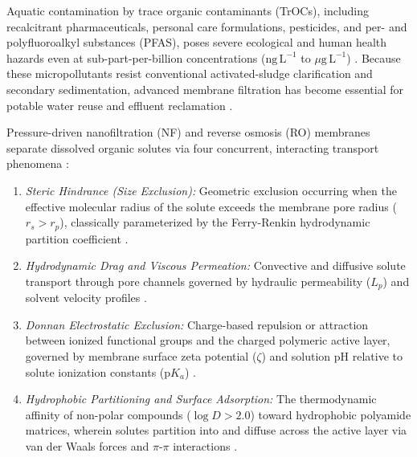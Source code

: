 \documentclass[11pt]{article}
\begin{document}
Aquatic contamination by trace organic contaminants (TrOCs), including recalcitrant pharmaceuticals, personal care formulations, pesticides, and per- and polyfluoroalkyl substances (PFAS), poses severe ecological and human health hazards even at sub-part-per-billion concentrations ($\mathrm{ng\,L^{-1}}$ to $\mu\mathrm{g\,L^{-1}}$) \cite{schwarzenbach2006,shannon2008,bellona2004}. Because these micropollutants resist conventional activated-sludge clarification and secondary sedimentation, advanced membrane filtration has become essential for potable water reuse and effluent reclamation \cite{verliefde2007,elimelech2011,werber2016,mohammad2015}.

Pressure-driven nanofiltration (NF) and reverse osmosis (RO) membranes separate dissolved organic solutes via four concurrent, interacting transport phenomena \cite{vanderbruggen2003,yangaliquintanilla2009}:
\begin{enumerate}[leftmargin=1.3em,itemsep=2pt,topsep=3pt]
\item \textit{Steric Hindrance (Size Exclusion):} Geometric exclusion occurring when the effective molecular radius of the solute exceeds the membrane pore radius ($r_s > r_p$), classically parameterized by the Ferry-Renkin hydrodynamic partition coefficient \cite{ferry1936,renkin1954}.
\item \textit{Hydrodynamic Drag and Viscous Permeation:} Convective and diffusive solute transport through pore channels governed by hydraulic permeability ($L_p$) and solvent velocity profiles \cite{spiegler1966,kedem1958}.
\item \textit{Donnan Electrostatic Exclusion:} Charge-based repulsion or attraction between ionized functional groups and the charged polymeric active layer, governed by membrane surface zeta potential ($\zeta$) and solution pH relative to solute ionization constants ($\mathrm{p}K_a$) \cite{bowen2002,bowen1998}.
\item \textit{Hydrophobic Partitioning and Surface Adsorption:} The thermodynamic affinity of non-polar compounds ($\log D > 2.0$) toward hydrophobic polyamide matrices, wherein solutes partition into and diffuse across the active layer via van der Waals forces and $\pi$-$\pi$ interactions \cite{kiso2001,nghiem2005}.
\end{enumerate}
\end{document}
